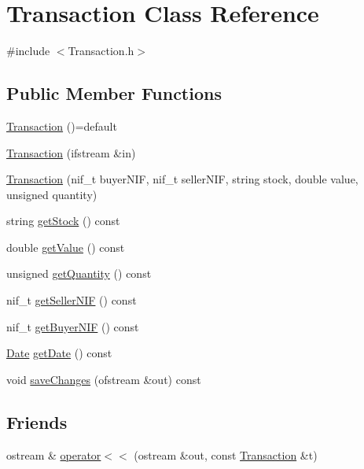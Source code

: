 \hypertarget{class_transaction}{}\section{Transaction Class Reference}
\label{class_transaction}


{\ttfamily \#include $<$Transaction.\+h$>$}

\subsection*{Public Member Functions}
\begin{DoxyCompactItemize}
\item 
\hyperlink{class_transaction_a0c8031bed6e7a45eda7bc2ca8f40e851}{Transaction} ()=default
\item 
\hyperlink{class_transaction_a2bbb78694a94a630cb1e9e741dc120a7}{Transaction} (ifstream \&in)
\item 
\hyperlink{class_transaction_abd1826b5a0499ddac290a4f1297e7455}{Transaction} (nif\+\_\+t buyer\+N\+IF, nif\+\_\+t seller\+N\+IF, string stock, double value, unsigned quantity)
\item 
string \hyperlink{class_transaction_af6582ddc59e9cfa99a7ef178216799be}{get\+Stock} () const
\item 
double \hyperlink{class_transaction_a95976b2e60b66d766edf4db534324db4}{get\+Value} () const
\item 
unsigned \hyperlink{class_transaction_ab3bfaa0469e1f45c5bd5dc164ac3c850}{get\+Quantity} () const
\item 
nif\+\_\+t \hyperlink{class_transaction_a3c3a57a3240bece392c56ff41bc3c21b}{get\+Seller\+N\+IF} () const
\item 
nif\+\_\+t \hyperlink{class_transaction_afa91c88bb936d8bd8480ac36b599649b}{get\+Buyer\+N\+IF} () const
\item 
\hyperlink{class_date}{Date} \hyperlink{class_transaction_af2ef4a1ef82f9ff5d34dae7234211589}{get\+Date} () const
\item 
void \hyperlink{class_transaction_a3c0c3c4a64c5b3d20c420708357a86be}{save\+Changes} (ofstream \&out) const
\end{DoxyCompactItemize}
\subsection*{Friends}
\begin{DoxyCompactItemize}
\item 
ostream \& \hyperlink{class_transaction_a75af23fbc3b593013d411cf50c5a3a7a}{operator$<$$<$} (ostream \&out, const \hyperlink{class_transaction}{Transaction} \&t)
\end{DoxyCompactItemize}


